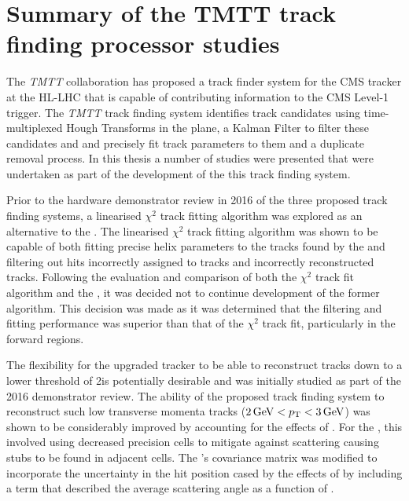 \section{Summary of the TMTT track finding processor studies}
The \emph{TMTT} collaboration has proposed a track finder system for the CMS tracker at the HL-LHC that is capable of contributing information to the CMS Level-1 trigger.
The \emph{TMTT} track finding system identifies track candidates using time-multiplexed Hough Transforms in the \rphi plane, a Kalman Filter to filter these candidates and and precisely fit track parameters to them and a duplicate removal process.
In this thesis a number of studies were presented that were undertaken as part of the development of the this track finding system.

Prior to the hardware demonstrator review in 2016 of the three proposed track finding systems, a linearised $\chi^{2}$ track fitting algorithm was explored as an alternative to the \KF.
The linearised $\chi^{2}$ track fitting algorithm was shown to be capable of both fitting precise helix parameters to the tracks found by the \HT and filtering out hits incorrectly assigned to tracks and incorrectly reconstructed tracks.
Following the evaluation and comparison of both the $\chi^{2}$ track fit algorithm and the \KF, it was decided not to continue development of the former algorithm.
This decision was made as it was determined that the \KF filtering and fitting performance was superior than that of the $\chi^{2}$ track fit, particularly in the forward regions.

The flexibility for the upgraded tracker to be able to reconstruct tracks down to a lower \pT threshold of 2\GeV is potentially desirable and was initially studied as part of the 2016 demonstrator review.
The ability of the proposed track finding system to reconstruct such low transverse momenta tracks ($2\,\text{Ge\hspace{-.08em}V} < p_{\mathrm{T}} < 3\,\text{Ge\hspace{-.08em}V}$) was shown to be considerably improved by accounting for the effects of \MS. 
For the \HT, this involved using decreased precision \HT cells to mitigate against scattering causing stubs to be found in adjacent cells.
The \KF's covariance matrix was modified to incorporate the uncertainty in the hit position cased by the effects of \MS by including a term that described the average scattering angle as a function of \pT.

